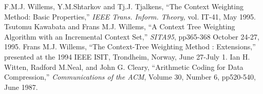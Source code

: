 \begin{thebibliography}{20}
 F.M.J. Willems, Y.M.Shtarkov and Tj.J. Tjalkens, ``The Context Weighting Method: Basic Properties,'' {\em IEEE Trans. Inform. Theory,} vol. IT-41, May 1995.
 Tsutomu Kawabata and Frans M.J. Willems, ``A Context Tree Weighting Algorithm with an Incremental Context Set,'' {\em SITA95}, pp365-368 October 24-27, 1995.
 Frans M.J. Willems, ``The Context-Tree Weighting Method : Extensions,'' presented at the 1994 IEEE ISIT, Trondheim, Norway, June 27-July 1.
 Ian H. Witten, Radford M.Neal, and John G. Cleary, ``Arithmetic Coding for Data Compression,'' {\em Communications of the ACM}, Volume 30, Number 6, pp520-540, June 1987.
\end{thebibliography}
